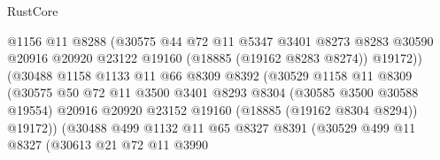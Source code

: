 \begin{lexlean}{RustCore}
\begin{coremodule}
                                  @1156
                                  @11
                                  @8288
                                  (@30575
                                    @44
                                    @72
                                    @11
                                    @5347
                                    @3401
                                    @8273
                                    @8283
                                    @30590
                                    @20916
                                    @20920
                                    @23122
                                    @19160
                                    (@18885 (@19162 @8283 @8274))
                                    @19172))
                                (@30488
                                  @1158
                                  @1133
                                  @11
                                  @66
                                  @8309
                                  @8392
                                  (@30529
                                    @1158
                                    @11
                                    @8309
                                    (@30575
                                      @50
                                      @72
                                      @11
                                      @3500
                                      @3401
                                      @8293
                                      @8304
                                      (@30585 @3500 @30588 @19554)
                                      @20916
                                      @20920
                                      @23152
                                      @19160
                                      (@18885 (@19162 @8304 @8294))
                                      @19172))
                                  (@30488
                                    @499
                                    @1132
                                    @11
                                    @65
                                    @8327
                                    @8391
                                    (@30529
                                      @499
                                      @11
                                      @8327
                                      (@30613
                                        @21
                                        @72
                                        @11
                                        @3990

\end{coremodule}
\end{lexlean}
